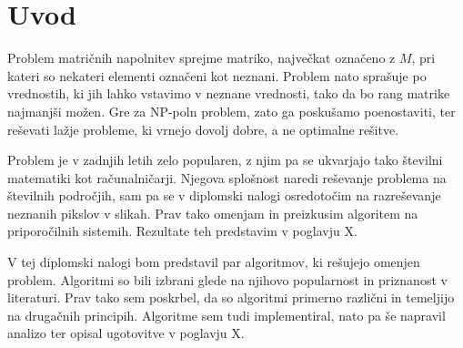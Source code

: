 \chapter{Uvod}
Problem matričnih napolnitev sprejme matriko, največkat označeno z $M$, pri kateri so nekateri elementi označeni kot neznani. Problem nato sprašuje po vrednostih, ki jih lahko vstavimo v neznane vrednosti, tako da bo rang matrike najmanjši možen. Gre za NP-poln problem, zato ga poskušamo poenostaviti, ter reševati lažje probleme, ki vrnejo dovolj dobre, a ne optimalne rešitve. 

Problem je v zadnjih letih zelo popularen, z njim pa se ukvarjajo tako številni matematiki kot računalničarji. Njegova splošnost naredi reševanje problema na številnih področjih, sam pa se v diplomski nalogi osredotočim na razreševanje neznanih pikslov v slikah. Prav tako omenjam in preizkusim algoritem na priporočilnih sistemih. Rezultate teh predstavim v poglavju X.

V tej diplomski nalogi bom predstavil par  algoritmov, ki rešujejo omenjen problem. Algoritmi so bili izbrani glede na njihovo popularnost in priznanost v literaturi. Prav tako sem poskrbel, da so algoritmi primerno različni in temeljijo na drugačnih principih. Algoritme sem tudi implementiral, nato pa še napravil analizo ter opisal ugotovitve v poglavju X.